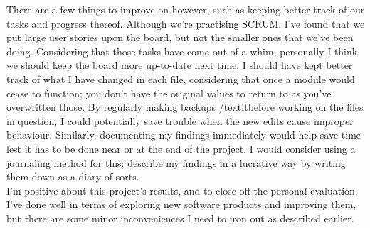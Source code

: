 There are a few things to improve on however, such as keeping better track of our tasks and progress thereof. Although we're practising SCRUM, I've found that we put large user stories upon the board, but not the smaller ones that we've been doing. Considering that those tasks have come out of a whim, personally I think we should keep the board more up-to-date next time.
I should have kept better track of what I have changed in each file, considering that once a module would cease to function; you don't have the original values to return to as you've overwritten those. By regularly making backups /textit{before} working on the files in question, I could potentially save trouble when the new edits cause improper behaviour.
Similarly, documenting my findings immediately would help save time lest it has to be done near or at the end of the project. 
I would consider using a journaling method for this; describe my findings in a lucrative way by writing them down as a diary of sorts.\\

I'm positive about this project's results, and to close off the personal evaluation: I've done well in terms of exploring new software products and improving them, but there are some minor inconveniences I need to iron out as described earlier.

\newpage